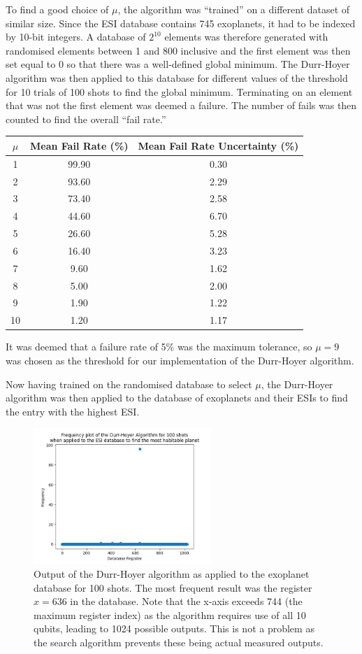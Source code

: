\documentclass{article}[11pt]
\begin{document}
To find a good choice of $\mu$, the algorithm was ``trained'' on a different dataset of similar size. Since the ESI database contains 745 exoplanets, it had to be indexed by 10-bit integers. A database of $2^{10}$ elements was therefore generated with randomised elements between 1 and 800 inclusive and the first element was then set equal to 0 so that there was a well-defined global minimum. The Durr-Hoyer algorithm was then applied to this database for different values of the threshold for 10 trials of 100 shots to find the global minimum. Terminating on an element that was not the first element was deemed a failure. The number of fails was then counted to find the overall ``fail rate.''
\begin{center}
\begin{tabular}{||c|c|c||}
\hline
$\mu$ & Mean Fail Rate (\%) & Mean Fail Rate Uncertainty (\%)\\
\hline
1 & 99.90 & 0.30\\
2 & 93.60 & 2.29\\
3 & 73.40 & 2.58\\
4 & 44.60 & 6.70\\
5 & 26.60 & 5.28\\
6 & 16.40 & 3.23\\
7 & 9.60 & 1.62\\
8 & 5.00 & 2.00\\
9 & 1.90 & 1.22\\
10 & 1.20 & 1.17\\
\hline
\end{tabular}
\end{center} 
It was deemed that a failure rate of 5\% was the maximum tolerance, so $\mu=9$ was chosen as the threshold for our implementation of the Durr-Hoyer algorithm.

Now having trained on the randomised database to select $\mu$, the Durr-Hoyer algorithm was then applied to the database of exoplanets and their ESIs to find the entry with the highest ESI.
\begin{figure}[H]
\centering
\includegraphics[width=0.6\textwidth]{Pictures/trappist.jpg}
\caption{Output of the Durr-Hoyer algorithm as applied to the exoplanet database for 100 shots. The most frequent result was the register $x=636$ in the database. Note that the x-axis exceeds 744 (the maximum register index) as the algorithm requires use of all 10 qubits, leading to 1024 possible outputs. This is not a problem as the search algorithm prevents these being actual measured outputs.}
\label{fig:GASfirstsearch}
\end{figure}
\end{document}
